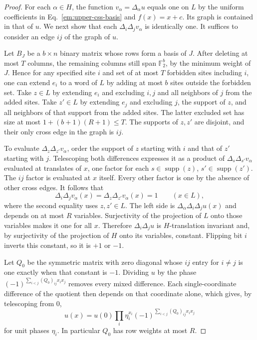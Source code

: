 \documentclass[aps,prl,reprint,notitlepage,nofootinbib,nobibnotes]{revtex4-2}
\begin{document}
\begin{proof}
For each \(\alpha\in H\), the function \(v_\alpha=\Delta_\alpha u\) equals one on \(L\) by the uniform coefficients in Eq.~\eqref{em:upper-css-basis} and \(f(x)=x+c\). Its graph is contained in that of \(u\). We next show that each \(\Delta_i\Delta_j v_\alpha\) is identically one. It suffices to consider an edge \(ij\) of the graph of \(u\).

Let \(B_J\) be a \(b\times n\) binary matrix whose rows form a basis of \(J\). After deleting at most \(T\) columns, the remaining columns still span \(\mathbb F_2^b\), by the minimum weight of \(J\). Hence for any specified site \(i\) and set of at most \(T\) forbidden sites including \(i\), one can extend \(e_i\) to a word of \(L\) by adding at most \(b\) sites outside the forbidden set. Take \(z\in L\) by extending \(e_i\) and excluding \(i,j\) and all neighbors of \(j\) from the added sites. Take \(z'\in L\) by extending \(e_j\) and excluding \(j\), the support of \(z\), and all neighbors of that support from the added sites. The latter excluded set has size at most \(1+(b+1)(R+1)\le T\). The supports of \(z,z'\) are disjoint, and their only cross edge in the graph is \(ij\).

To evaluate \(\Delta_z\Delta_{z'}v_\alpha\), order the support of \(z\) starting with \(i\) and that of \(z'\) starting with \(j\). Telescoping both differences expresses it as a product of \(\Delta_s\Delta_{s'}v_\alpha\) evaluated at translates of \(x\), one factor for each \(s\in\operatorname{supp}(z)\), \(s'\in\operatorname{supp}(z')\). The \(ij\) factor is evaluated at \(x\) itself. Every other factor is one by the absence of other cross edges. It follows that
\[
 \Delta_i\Delta_j v_\alpha(x)=\Delta_z\Delta_{z'}v_\alpha(x)=1
 \qquad (x\in L),
\]
where the second equality uses \(z,z'\in L\). The left side is \(\Delta_\alpha\Delta_i\Delta_j u(x)\) and depends on at most \(R\) variables. Surjectivity of the projection of \(L\) onto those variables makes it one for all \(x\). Therefore \(\Delta_i\Delta_j u\) is \(H\)-translation invariant and, by surjectivity of the projection of \(H\) onto its variables, constant. Flipping bit \(i\) inverts this constant, so it is \(+1\) or \(-1\).

Let \(Q_0\) be the symmetric matrix with zero diagonal whose \(ij\) entry for \(i\ne j\) is one exactly when that constant is \(-1\). Dividing \(u\) by the phase \((-1)^{\sum_{i<j}(Q_0)_{ij}x_i x_j}\) removes every mixed difference. Each single-coordinate difference of the quotient then depends on that coordinate alone, which gives, by telescoping from \(0\),
\begin{equation}\label{em:upper-phase}
 u(x)=u(0)\prod_i\eta_i^{x_i}
          (-1)^{\sum_{i<j}(Q_0)_{ij}x_i x_j}
\end{equation}
for unit phases \(\eta_i\). In particular \(Q_0\) has row weights at most \(R\).


\end{proof}
\end{document}
